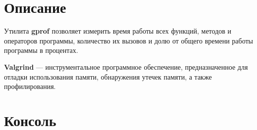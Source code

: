 \section{Описание}

Утилита \textbf{gprof} позволяет измерить время работы всех функций, методов и операторов
программы, количество их вызовов и долю от общего времени работы программы в 
процентах.

\textbf{Valgrind} — инструментальное программное обеспечение, предназначенное для отладки использования памяти, обнаружения утечек памяти, а также профилирования.

\pagebreak

\section{Консоль}
